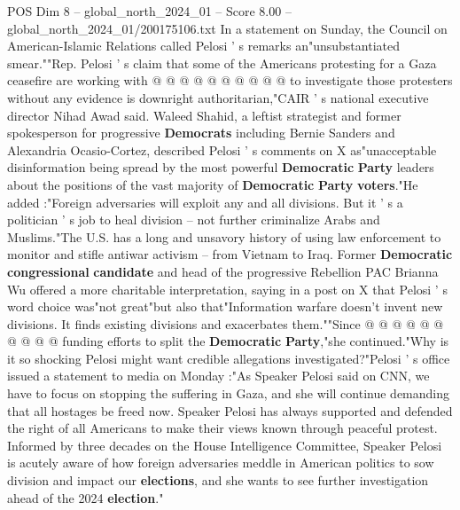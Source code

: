\begin{textsample}{POS Dim 8 – global\_north\_2024\_01 – Score 8.00 – global\_north\_2024\_01/200175106.txt}
In a statement on Sunday, the Council on American-Islamic Relations called Pelosi ' s remarks an"unsubstantiated smear.""Rep.
Pelosi ' s claim that some of the Americans protesting for a Gaza ceasefire are working with @ @ @ @ @ @ @ @ @ @ to investigate those protesters without any evidence is downright authoritarian,"CAIR ' s national executive director Nihad Awad said.
Waleed Shahid, a leftist strategist and former spokesperson for progressive \textbf{Democrats} including Bernie Sanders and Alexandria Ocasio-Cortez, described Pelosi ' s comments on X as"unacceptable disinformation being spread by the most powerful \textbf{Democratic} \textbf{Party} leaders about the positions of the vast majority of \textbf{Democratic} \textbf{Party} \textbf{voters}."He added :"Foreign adversaries will exploit any and all divisions.
But it ' s a politician ' s job to heal division -- not further criminalize Arabs and Muslims."The U.S. has a long and unsavory history of using law enforcement to monitor and stifle antiwar activism -- from Vietnam to Iraq.
Former \textbf{Democratic} \textbf{congressional} \textbf{candidate} and head of the progressive Rebellion PAC Brianna Wu offered a more charitable interpretation, saying in a post on X that Pelosi ' s word choice was"not great"but also that"Information warfare doesn't invent new divisions.
It finds existing divisions and exacerbates them.""Since @ @ @ @ @ @ @ @ @ @ funding efforts to split the \textbf{Democratic} \textbf{Party},"she continued."Why is it so shocking Pelosi might want credible allegations investigated?"Pelosi ' s office issued a statement to media on Monday :"As Speaker Pelosi said on CNN, we have to focus on stopping the suffering in Gaza, and she will continue demanding that all hostages be freed now.
Speaker Pelosi has always supported and defended the right of all Americans to make their views known through peaceful protest.
Informed by three decades on the House Intelligence Committee, Speaker Pelosi is acutely aware of how foreign adversaries meddle in American politics to sow division and impact our \textbf{elections}, and she wants to see further investigation ahead of the 2024 \textbf{election}."

\end{textsample}
